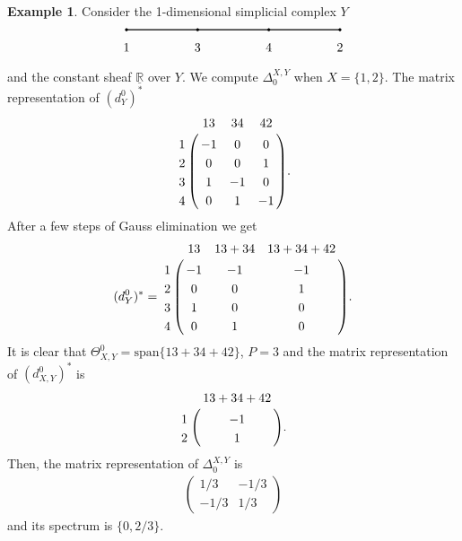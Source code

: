 \documentclass[11pt]{article}
\theoremstyle{definition}
\theoremstyle{definition}
\newtheorem{example}{Example}[section]
\begin{document}
\begin{example}
    Consider the 1-dimensional simplicial complex $Y$
    \begin{align*}
        \begin{tikzpicture}
            \centering
            \draw[fill=black] (0,0) circle (1pt);
            \draw[fill=black] (6,0) circle (1pt);
            \draw[fill=black] (2,0) circle (1pt);
            \draw[fill=black] (4,0) circle (1pt);
            \node at (0,-0.5) {1};
            \node at (6,-0.5) {2};
            \node at (2,-0.5) {3};
            \node at (4,-0.5) {4};
            \draw[thick] (0,0) -- (2,0) -- (4,0) -- (6,0);
        \end{tikzpicture}
    \end{align*}
    and the constant sheaf $\underline{\mathbb{R}}$ over $Y$. 
    We compute $\Delta_{0}^{X,Y}$ when $X= \{1,2\}$. 
    The matrix representation of $(d^0_{Y})^{\ast}$ 
    \begin{align*}
        \bordermatrix{
            ~ & 13 & 34 & 42  \cr
            1 & -1 &  0 &  0  \cr
            2 &  0 &  0 &  1  \cr
            3 &  1 & -1 &  0  \cr
            4 &  0 &  1 & -1  \cr
        }.
    \end{align*} 
    After a few steps of Gauss elimination we get
    \begin{align*}
        (d^0_Y)^{\ast} = \bordermatrix{
            ~ & 13 & 13+34 & 13+34+42  \cr
            1 & -1 &    -1 &       -1  \cr
            2 &  0 &     0 &        1  \cr
            3 &  1 &     0 &        0  \cr
            4 &  0 &     1 &        0  \cr
        }.
    \end{align*}
    It is clear that $\Theta^{0}_{X,Y}=\text{span}\{13+34+42\}$, $P=3$ and 
    the matrix representation of $(d^{0}_{X,Y})^{\ast}$ is
    \begin{align*}
        \bordermatrix{
            ~ & 13+34+42  \cr
            1 &       -1  \cr
            2 &        1  \cr
        }.
    \end{align*} Then, the matrix representation of $\Delta_{0}^{X,Y}$ is 
    \begin{align*}
        \begin{pmatrix}
            1/3 & -1/3 \\
            -1/3 & 1/3
        \end{pmatrix}
    \end{align*} and its spectrum is $\{0,2/3\}$. 
\end{example}
\end{document}
